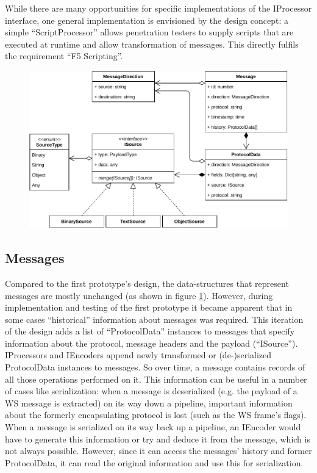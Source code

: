 While there are many opportunities for specific implementations of the IProcessor interface, one general implementation is envisioned by the design concept: a simple \enquote{ScriptProcessor} allows penetration testers to supply scripts that are executed at runtime and allow transformation of messages. This directly fulfils the requirement \enquote{F5 Scripting}.
\begin{figure}[h]
    \centering
    \includegraphics[width=14cm]{img/ch05/classes-4-messages.pdf}
    \label{fig:classes-4-messages}
\end{figure}
\subsection{Messages}
Compared to the first prototype's design, the data-structures that represent messages are mostly unchanged (as shown in figure \ref{fig:classes-4-messages}). However, during implementation and testing of the first prototype it became apparent that in some cases \enquote{historical} information about messages was required. This iteration of the design adds a list of \enquote{ProtocolData} instances to messages that specify information about the protocol, message headers and the payload (\enquote{ISource}). IProcessors and IEncoders append newly transformed or (de-)serialized ProtocolData instances to messages. So over time, a message contains records of all those operations performed on it. This information can be useful in a number of cases like serialization: when a message is deserialized (e.g. the payload of a \ac{WS} message is extracted) on its way down a pipeline, important information about the formerly encapsulating protocol is lost (such as the \ac{WS} frame's flags). When a message is serialized on its way back up a pipeline, an IEncoder would have to generate this information or try and deduce it from the message, which is not always possible. However, since it can access the messages' history and former ProtocolData, it can read the original information and use this for serialization.

